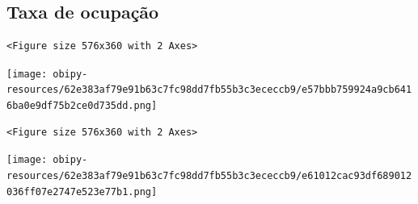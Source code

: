 \documentclass[11pt]{article}
\begin{document}
\subsection{Taxa de ocupação}
\label{sec:org182e31c}

\begin{verbatim}
<Figure size 576x360 with 2 Axes>
\end{verbatim}


\begin{center}
\texttt{[image: obipy-resources/62e383af79e91b63c7fc98dd7fb55b3c3ececcb9/e57bbb759924a9cb6416ba0e9df75b2ce0d735dd.png]}
\end{center}


\begin{verbatim}
<Figure size 576x360 with 2 Axes>
\end{verbatim}


\begin{center}
\texttt{[image: obipy-resources/62e383af79e91b63c7fc98dd7fb55b3c3ececcb9/e61012cac93df689012036ff07e2747e523e77b1.png]}
\end{center}
\end{document}
